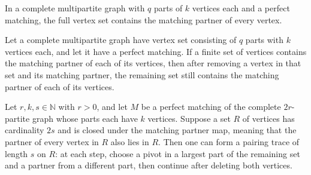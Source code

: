 \begin{theorem}
\label{FABL.graphMatchingClosedOn_univ}
\leanok
{}
In a complete multipartite graph with $q$ parts of $k$ vertices each and a perfect
matching, the full vertex set contains the matching partner of every vertex.
\end{theorem}

\begin{theorem}
\label{FABL.graphMatchingClosedOn_erase_pair}
\leanok
{}
Let a complete multipartite graph have vertex set consisting of $q$ parts with $k$
vertices each, and let it have a perfect matching. If a finite set of vertices contains
the matching partner of each of its vertices, then after removing a vertex in that set
and its matching partner, the remaining set still contains the matching partner of each
of its vertices.
\end{theorem}

\begin{definition}
\label{FABL.graphMatchingTrace}
\leanok
{}
Let $r,k,s\in\mathbb{N}$ with $r>0$, and let $M$ be a perfect matching of the complete
$2r$-partite graph whose parts each have $k$ vertices. Suppose a set $R$ of vertices has
cardinality $2s$ and is closed under the matching partner map, meaning that the partner
of every vertex in $R$ also lies in $R$. Then one can form a pairing trace of length $s$
on $R$: at each step, choose a pivot in a largest part of the remaining set and a
partner from a different part, then continue after deleting both vertices.
\end{definition}

